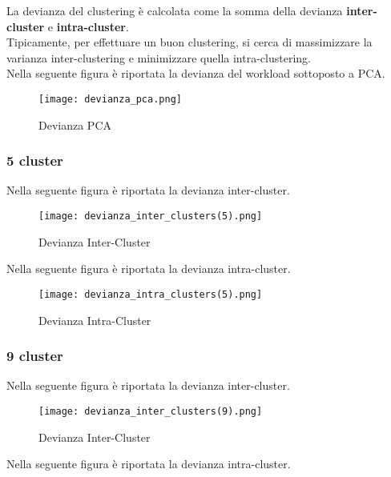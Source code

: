 La devianza del clustering è calcolata come la somma della devianza \textbf{inter-cluster}
e \textbf{intra-cluster}.\\
Tipicamente, per effettuare un buon clustering, si cerca di massimizzare la varianza
inter-clustering e minimizzare quella intra-clustering.\\
Nella seguente figura è riportata la devianza del workload sottoposto a PCA.\\

\begin{figure}[!htbp]
  \centering
	\texttt{[image: devianza\_pca.png]}
  \caption{Devianza PCA}
  \label{}
\end{figure}
\clearpage

\subsubsection{5 cluster}

Nella seguente figura è riportata la devianza inter-cluster.\\

\begin{figure}[!htbp]
  \centering
	\texttt{[image: devianza\_inter\_clusters(5).png]}
  \caption{Devianza Inter-Cluster}
  \label{}
\end{figure}

Nella seguente figura è riportata la devianza intra-cluster.\\

\begin{figure}[!htbp]
  \centering
	\texttt{[image: devianza\_intra\_clusters(5).png]}
  \caption{Devianza Intra-Cluster}
  \label{}
\end{figure}
\clearpage

\subsubsection{9 cluster}

Nella seguente figura è riportata la devianza inter-cluster.\\

\begin{figure}[!htbp]
  \centering
	\texttt{[image: devianza\_inter\_clusters(9).png]}
  \caption{Devianza Inter-Cluster}
  \label{}
\end{figure}

Nella seguente figura è riportata la devianza intra-cluster.\\

